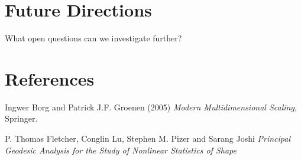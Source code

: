 \documentclass[12pt]{report}
\begin{document}
\chapter*{Future Directions}

What open questions can we investigate further?


\chapter*{References}
\begin{thebibliography}{9}


Ingwer Borg and Patrick J.F. Groenen (2005) \textit{Modern Multidimensional Scaling}, Springer.

P. Thomas Fletcher, Conglin Lu, Stephen M. Pizer and Sarang Joshi \textit{Principal Geodesic Analysis for the Study of
Nonlinear Statistics of Shape}




\end{thebibliography}
\end{document}
